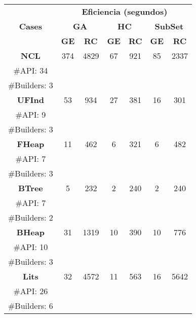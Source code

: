 \begin{table}[H]
\centering
\label{tab:t1}
\scriptsize
\begin{tabular}{|c c|cc|cc|cc|}
\midrule
\multicolumn{2}{|c|}{\multirow{3}{*}{\textbf{Cases}}} & \multicolumn{6}{c|}{\textbf{Eficiencia (segundos)}} \\
\cline{3-8}
\multicolumn{2}{|c|}{} & \multicolumn{2}{c}{\textbf{GA}} & \multicolumn{2}{c}{\textbf{HC}} & \multicolumn{2}{c|}{\textbf{SubSet}} \\
\multicolumn{2}{|c|}{} & \textbf{\tiny{GE}} & \textbf{\tiny{RC}} & \textbf{\tiny{GE}} & \textbf{\tiny{RC}} & \textbf{\tiny{GE}} & \textbf{\tiny{RC}} \\
\midrule
\multicolumn{2}{|c|}{\textbf{NCL}} & 374  & 4829   & 67 &  921 &85 & 2337 \\
\multicolumn{2}{|c|}{\tiny \#API: 34} &  &   & &   & & \\
\multicolumn{2}{|c|}{\tiny \#Builders: 3} &  &   & &   & & \\
\midrule
\multicolumn{2}{|c|}{\textbf{UFInd}}& 53  & 934  &  27 &381   & 16  &  301    \\
\multicolumn{2}{|c|}{\tiny \#API: 9} &  &   & &   & & \\
\multicolumn{2}{|c|}{\tiny \#Builders: 3} &  &   & &   & & \\
\midrule
\multicolumn{2}{|c|}{\textbf{FHeap}} & 11  & 462  & 6  &321   &  6 &  482   \\
\multicolumn{2}{|c|}{\tiny \#API: 7} &  &   & &   & & \\
\multicolumn{2}{|c|}{\tiny \#Builders: 3} &  &   & &   & & \\
\midrule
\multicolumn{2}{|c|}{\textbf{BTree}} &  5 &  232 & 2  & 240   &  2 & 240   \\
\multicolumn{2}{|c|}{\tiny \#API: 7} &  &   & &   & & \\
\multicolumn{2}{|c|}{\tiny \#Builders: 2} &  &   & &   & & \\
\midrule
\multicolumn{2}{|c|}{\textbf{BHeap}} & 31 &  1319 & 10 & 390  & 10 &  776   \\
\multicolumn{2}{|c|}{\tiny \#API: 10} &  &   & &   & & \\
\multicolumn{2}{|c|}{\tiny \#Builders: 3} &  &   & &   & & \\
\midrule
\multicolumn{2}{|c|}{\textbf{Lits}} & 32  & 4572  & 11  &  563 & 16  & 5642   \\
\multicolumn{2}{|c|}{\tiny \#API: 26} &  &   & &   & & \\
\multicolumn{2}{|c|}{\tiny \#Builders: 6} &  &   & &   & & \\

\end{tabular}
\end{table}
